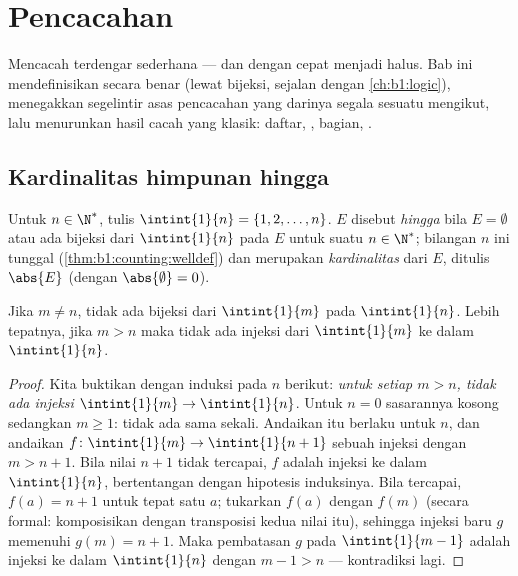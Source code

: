 \chapter{Pencacahan}\label{ch:b1:counting}

Mencacah  terdengar sederhana --- dan dengan cepat
menjadi halus. Bab ini mendefinisikan  secara benar (lewat
bijeksi, sejalan dengan \cref{ch:b1:logic}), menegakkan segelintir
asas pencacahan yang darinya segala sesuatu mengikut, lalu menurunkan
hasil cacah yang klasik: daftar, ,  bagian, .

\section{Kardinalitas himpunan hingga}

\begin{definition}\label{def:b1:counting:card}
Untuk $n \in \N^*$, tulis $\intint{1}{n} = \{1, 2, \dots,
n\}$.  $E$ disebut \emph{hingga} bila $E = \emptyset$
atau ada bijeksi dari $\intint{1}{n}$ pada $E$ untuk
suatu $n \in \N^*$; bilangan $n$ ini tunggal (\cref{thm:b1:counting:welldef})
dan merupakan \emph{kardinalitas} dari $E$, ditulis
$\abs{E}$ (dengan $\abs{\emptyset} = 0$).
\end{definition}

\begin{theorem}\label{thm:b1:counting:welldef}
Jika $m \neq n$, tidak ada bijeksi dari $\intint{1}{m}$
pada $\intint{1}{n}$. Lebih tepatnya, jika $m > n$ maka tidak ada
injeksi dari $\intint{1}{m}$ ke dalam $\intint{1}{n}$.
\end{theorem}

\begin{proof}
Kita buktikan dengan induksi pada $n$  berikut: \emph{untuk setiap $m > n$,
tidak ada injeksi $\intint{1}{m} \to \intint{1}{n}$}. Untuk $n = 0$ sasarannya kosong sedangkan $m \geq 1$: tidak ada 
sama sekali. Andaikan  itu berlaku untuk $n$, dan andaikan $f \colon
\intint{1}{m} \to \intint{1}{n+1}$ sebuah
injeksi dengan $m > n + 1$. Bila nilai $n + 1$ tidak tercapai, $f$
adalah injeksi ke dalam $\intint{1}{n}$, bertentangan dengan
hipotesis induksinya. Bila tercapai, $f(a) = n + 1$ untuk tepat satu $a$;
tukarkan $f(a)$ dengan $f(m)$ (secara formal: komposisikan dengan transposisi
kedua nilai itu), sehingga injeksi baru $g$ memenuhi $g(m) = n + 1$.
Maka pembatasan $g$ pada $\intint{1}{m-1}$ adalah
injeksi ke dalam $\intint{1}{n}$ dengan $m - 1 > n$ ---
kontradiksi lagi.
\end{proof}

